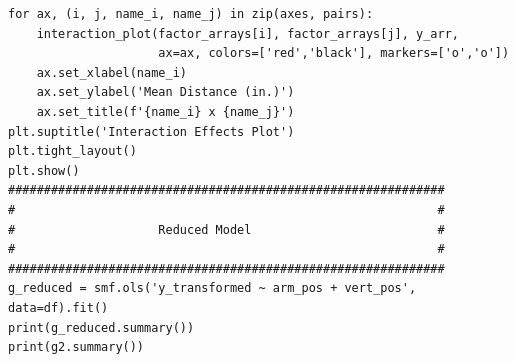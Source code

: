 \documentclass[11pt]{article}
\begin{document}
\begin{verbatim}
for ax, (i, j, name_i, name_j) in zip(axes, pairs):
    interaction_plot(factor_arrays[i], factor_arrays[j], y_arr,
                     ax=ax, colors=['red','black'], markers=['o','o'])
    ax.set_xlabel(name_i)
    ax.set_ylabel('Mean Distance (in.)')
    ax.set_title(f'{name_i} x {name_j}')
plt.suptitle('Interaction Effects Plot')
plt.tight_layout()
plt.show()
#############################################################
#                                                           #
#                    Reduced Model                          #
#                                                           #
#############################################################
g_reduced = smf.ols('y_transformed ~ arm_pos + vert_pos', data=df).fit()
print(g_reduced.summary())
print(g2.summary())
	
	
	\end{verbatim}
	
	
\end{document}
